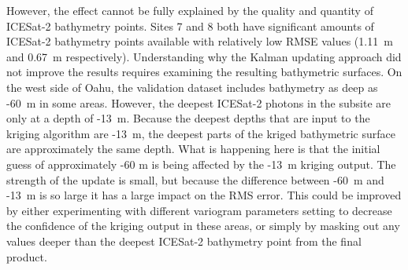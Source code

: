 However, the effect cannot be fully explained by the quality and quantity of ICESat-2 bathymetry points. Sites 7 and 8 both have significant amounts of ICESat-2 bathymetry points available with relatively low RMSE values (1.11~m and 0.67~m respectively). Understanding why the Kalman updating approach did not improve the results requires examining the resulting bathymetric surfaces. On the west side of Oahu, the validation dataset includes bathymetry as deep as -60~m in some areas. However, the deepest ICESat-2 photons in the subsite are only at a depth of -13~m. Because the deepest depths that are input to the kriging algorithm are -13~m, the deepest parts of the kriged bathymetric surface are approximately the same depth. What is happening here is that the initial guess of approximately -60 m is being affected by the -13~m kriging output. The strength of the update is small, but because the difference between -60~m and -13~m is so large it has a large impact on the RMS error. This could be improved by either experimenting with different variogram parameters setting to decrease the confidence of the kriging output in these areas, or simply by masking out any values deeper than the deepest ICESat-2 bathymetry point from the final product.

\begin{figure}
    \begin{floatrow}
    \end{floatrow}
\end{figure}

